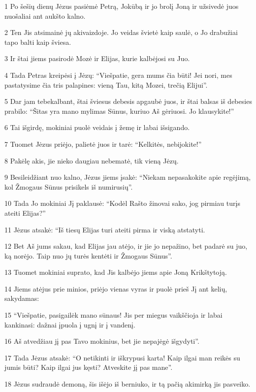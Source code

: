 \par 1 Po šešių dienų Jėzus pasiėmė Petrą, Jokūbą ir jo brolį Joną ir užsivedė juos nuošaliai ant aukšto kalno. 
\par 2 Ten Jis atsimainė jų akivaizdoje. Jo veidas švietė kaip saulė, o Jo drabužiai tapo balti kaip šviesa. 
\par 3 Ir štai jiems pasirodė Mozė ir Elijas, kurie kalbėjosi su Juo. 
\par 4 Tada Petras kreipėsi į Jėzų: “Viešpatie, gera mums čia būti! Jei nori, mes pastatysime čia tris palapines: vieną Tau, kitą Mozei, trečią Elijui”. 
\par 5 Dar jam tebekalbant, štai šviesus debesis apgaubė juos, ir štai balsas iš debesies prabilo: “Šitas yra mano mylimas Sūnus, kuriuo Aš gėriuosi. Jo klausykite!” 
\par 6 Tai išgirdę, mokiniai puolė veidais į žemę ir labai išsigando. 
\par 7 Tuomet Jėzus priėjo, palietė juos ir tarė: “Kelkitės, nebijokite!” 
\par 8 Pakėlę akis, jie nieko daugiau nebematė, tik vieną Jėzų. 
\par 9 Besileidžiant nuo kalno, Jėzus jiems įsakė: “Niekam nepasakokite apie regėjimą, kol Žmogaus Sūnus prisikels iš numirusių”. 
\par 10 Tada Jo mokiniai Jį paklausė: “Kodėl Rašto žinovai sako, jog pirmiau turįs ateiti Elijas?” 
\par 11 Jėzus atsakė: “Iš tiesų Elijas turi ateiti pirma ir viską atstatyti. 
\par 12 Bet Aš jums sakau, kad Elijas jau atėjo, ir jie jo nepažino, bet padarė su juo, ką norėjo. Taip nuo jų turės kentėti ir Žmogaus Sūnus”. 
\par 13 Tuomet mokiniai suprato, kad Jis kalbėjo jiems apie Joną Krikštytoją. 
\par 14 Jiems atėjus prie minios, priėjo vienas vyras ir puolė prieš Jį ant kelių, sakydamas: 
\par 15 “Viešpatie, pasigailėk mano sūnaus! Jis per miegus vaikščioja ir labai kankinasi: dažnai įpuola į ugnį ir į vandenį. 
\par 16 Aš atvedžiau jį pas Tavo mokinius, bet jie nepajėgė išgydyti”. 
\par 17 Tada Jėzus atsakė: “O netikinti ir iškrypusi karta! Kaip ilgai man reikės su jumis būti? Kaip ilgai jus kęsti? Atveskite jį pas mane”. 
\par 18 Jėzus sudraudė demoną, šis išėjo iš berniuko, ir tą pačią akimirką jis pasveiko. 
